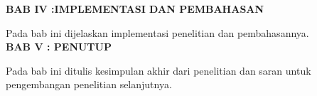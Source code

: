 \noindent
\textbf{BAB IV :IMPLEMENTASI DAN PEMBAHASAN}

Pada bab ini dijelaskan implementasi penelitian dan pembahasannya.\\

\noindent
\textbf{BAB V : PENUTUP }

Pada bab ini ditulis kesimpulan akhir dari penelitian dan saran untuk pengembangan penelitian selanjutnya.\\

\begin{comment}

\end{comment}
